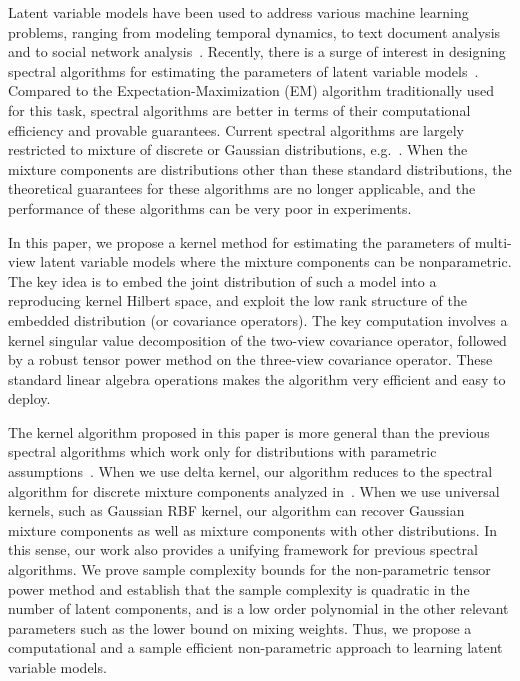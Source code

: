 \documentclass{article}
\begin{document}
\setlength{\textfloatsep}{3ex}
  
Latent variable models have been used to address various machine learning
problems, ranging from modeling temporal dynamics, to text document analysis and to social network analysis~\citep{RabJua86,Clark90,HofRafHan02,BleNgJor03}.
Recently, there is a surge of interest in designing spectral algorithms for estimating the parameters of latent variable models~\citep{HsuKakZha09,ParSonXin11,SonParXin11,FosRodUng12,more on parameter estimation}. Compared to the Expectation-Maximization (EM) algorithm \citep{DemLaiRub77} traditionally used for this task, spectral algorithms are better in terms of their computational efficiency and provable guarantees.
Current spectral algorithms are largely restricted to mixture
of discrete or Gaussian distributions, e.g.~\citep{AnandkumarEtal:tensor12,Hsu13}. When the mixture components are distributions other than these standard distributions, the theoretical guarantees for these algorithms are no longer applicable, and the performance of these algorithms can be very poor in experiments.

In this paper, we propose a kernel method for estimating the parameters of multi-view latent variable models where the mixture components can be nonparametric. The key idea  is to embed the joint distribution of such a model into a reproducing kernel Hilbert space, and exploit the low rank structure of the embedded distribution (or covariance operators). The key computation   involves a kernel singular value decomposition of the two-view covariance operator, followed by a robust tensor power method on the three-view covariance operator. These standard linear algebra operations makes the algorithm very efficient and easy to deploy.

The kernel algorithm proposed in this paper is more general than the previous spectral algorithms which work only for distributions with parametric assumptions~\citep{AnandkumarEtal:tensor12,Hsu13}. When we use delta kernel, our algorithm reduces to the spectral algorithm for discrete mixture components analyzed in~\citep{AnandkumarEtal:tensor12}. When we use universal kernels, such as Gaussian RBF kernel, our algorithm can recover Gaussian mixture components as well as mixture components with other distributions. In this sense, our work  also provides a unifying framework for previous spectral algorithms. We prove sample complexity bounds for the non-parametric tensor power method and establish  that the sample complexity is quadratic in  the number of latent components, and is a low order polynomial in the other relevant parameters such as the lower bound on mixing weights. Thus, we propose a computational and a sample efficient non-parametric approach to learning latent variable models.
\end{document}
